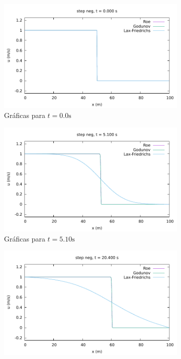 \documentclass[12pt]{article}
\begin{document}
 \begin{figure}[h]
 	\centering
 	\begin{subfigure}[b]{0.49\textwidth}
 		\includegraphics[width=\textwidth]{../burgers1DVF/results/sol_fijas/step_neg/000.pdf}
 		\caption*{Gráficas para $t=0.0\unit{\second}$}
 		\label{fig:step_neg-fija1}
 	\end{subfigure}
 	\vfill
 	\begin{subfigure}[b]{0.49\textwidth}
 		\includegraphics[width=\textwidth]{../burgers1DVF/results/sol_fijas/step_neg/170.pdf}
 		\caption*{Gráficas para $t=5.10\unit{\second}$}
 		\label{fig:step_neg-fija2}
 	\end{subfigure}
 	\vfill
 	\begin{subfigure}[b]{0.49\textwidth}
 		\includegraphics[width=\textwidth]{../burgers1DVF/results/sol_fijas/step_neg/680.pdf}

\end{subfigure}
\end{figure}
\end{document}
